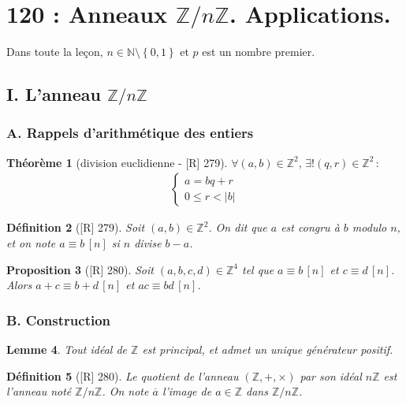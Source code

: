\documentclass[10pt, a4paper, parskip=full, twoside, twocolumn]{report}
\newtheorem{definition}{Définition}
\newtheorem{theorem}[definition]{Théorème}
\newtheorem{proposition}[definition]{Proposition}
\newtheorem{lemma}[definition]{Lemme}
\newcommand{\IN}{\mathbb{N}}
\newcommand{\IZ}{\mathbb{Z}}
\newcommand{\IZnZ}{\mathbb{Z}/n\mathbb{Z}}
\begin{document}
\chapter*{120 : Anneaux $\IZnZ$. Applications.}
Dans toute la leçon, $n\in\IN\setminus\left\{0,1\right\}$ et $p$ est un nombre premier.
\setcounter{definition}{0}
\section*{I. L'anneau $\IZnZ$}
\subsection*{A. Rappels d'arithmétique des entiers}
\begin{theorem}[division euclidienne - \textnormal{[R] 279}]
	$\forall (a,b)\in\IZ^2,\,\exists ! (q,r)\in\IZ^2 \,\colon$
	\begin{align*}
		\begin{cases}
			a=bq+r \\
			0\leq r< |b|
		\end{cases}
	\end{align*}
\end{theorem}

\begin{definition}[\textnormal{[R] 279}]
	Soit $(a,b)\in\IZ^2$. On dit que $a$ est \emph{congru à} $b$ modulo $n$,
	et on note $a\equiv b \, [n]$ si $n$ divise $b-a$.
\end{definition}

\begin{proposition}[\textnormal{[R] 280}]
	Soit $(a,b,c,d)\in\IZ^4$ tel que $a\equiv b\,[n]$ et $c\equiv d\,[n]$.
	Alors $a+c\equiv b+d\,[n]$ et $ac\equiv bd \,[n]$.
\end{proposition}

\subsection*{B. Construction}
\begin{lemma}
	Tout idéal de $\IZ$ est principal, et admet un unique générateur positif.
\end{lemma}

\begin{definition}[\textnormal{[R] 280}]
	Le quotient de l'anneau $(\IZ, +,\times)$ par son idéal $n\IZ$ est l'anneau noté $\IZnZ$. On note $\overline{a}$ l'image de $a\in\IZ$ dans $\IZnZ$.
\end{definition}
\end{document}
